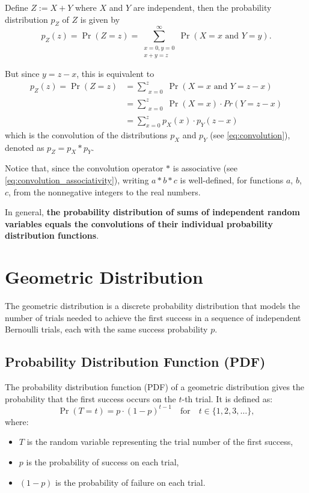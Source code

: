 \documentclass{masterthesis}
\begin{document}
Define $Z := X+Y$ where $X$ and $Y$ are independent, then the probability distribution $p_Z$ of $Z$ is given by 
\begin{equation}
    p_Z(z) = \Pr(Z = z) = \sum_{\substack{x=0, y=0 \\ x+y=z}}^{\infty} \Pr(X = x \text{ and } Y = y).
\end{equation}

But since $y = z - x$, this is equivalent to
\begin{align}
    p_Z(z) = \Pr(Z = z) &= \sum_{\substack{x=0}}^{z} \Pr(X = x \text{ and } Y = z - x) \\ 
                        &= \sum_{\substack{x=0}}^{z} \Pr(X = x) \cdot Pr(Y = z - x) \\
                        &= \sum_{x=0}^{z} p_X(x) \cdot p_Y (z - x)
\end{align}
which is the convolution of the distributions $p_X$ and $p_Y$ (see \ref{eq:convolution}), denoted as $p_Z = p_X * p_Y$.

Notice that, since the convolution operator $*$ is associative (see \ref{eq:convolution_associativity}), writing $a * b * c$ is well-defined, for functions $a$, $b$, $c$, from the nonnegative integers to the real numbers.

In general, \textbf{the probability distribution of sums of independent random variables equals the convolutions of their individual probability distribution functions}.

\section*{Geometric Distribution}\label{section:geometric_distribution}

The geometric distribution is a discrete probability distribution that models the number of trials needed to achieve the first success in a sequence of independent Bernoulli trials, each with the same success probability $p$.

\subsection*{Probability Distribution Function (PDF)}\label{subsection:geometric_pdf}

The probability distribution function (PDF) of a geometric distribution gives the probability that the first success occurs on the $t$-th trial. It is defined as:
\begin{equation}
    \Pr(T = t) = p \cdot (1 - p)^{t-1} \quad \text{for} \quad t \in \{1, 2, 3, \ldots \},
\end{equation}
where:
\begin{itemize}
    \item $T$ is the random variable representing the trial number of the first success,
    \item $p$ is the probability of success on each trial,
    \item $(1 - p)$ is the probability of failure on each trial.
\end{itemize}
\end{document}
